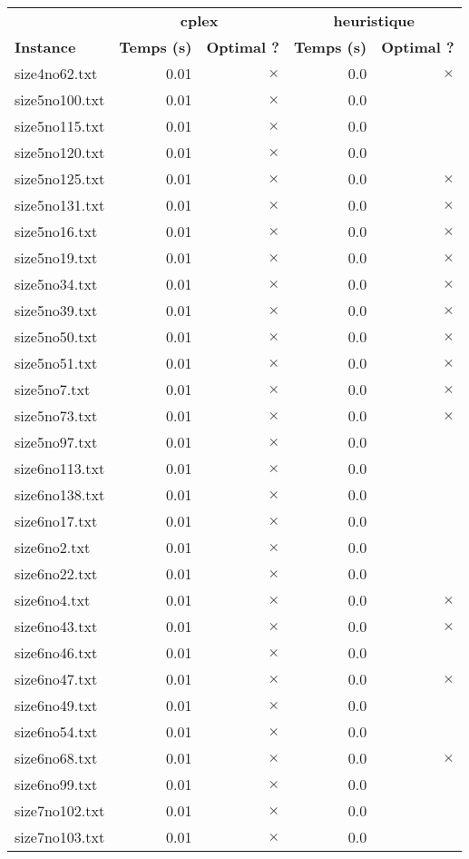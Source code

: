 \documentclass{article}
\begin{document}
\newpage
\begin{center}
\renewcommand{\arraystretch}{1.4} 
 \begin{tabular}{lrrrr}
	\hline
 & \multicolumn{2}{c}{\textbf{cplex}} & \multicolumn{2}{c}{\textbf{heuristique}}\\
\textbf{Instance}  & \textbf{Temps (s)} & \textbf{Optimal ?}  & \textbf{Temps (s)} & \textbf{Optimal ?} \\\hline

size4no62.txt & 0.01 & 
$\times$
 & 0.0 & 
$\times$
\\
size5no100.txt & 0.01 & 
$\times$
 & 0.0 & 
\\
size5no115.txt & 0.01 & 
$\times$
 & 0.0 & 
\\
size5no120.txt & 0.01 & 
$\times$
 & 0.0 & 
\\
size5no125.txt & 0.01 & 
$\times$
 & 0.0 & 
$\times$
\\
size5no131.txt & 0.01 & 
$\times$
 & 0.0 & 
$\times$
\\
size5no16.txt & 0.01 & 
$\times$
 & 0.0 & 
$\times$
\\
size5no19.txt & 0.01 & 
$\times$
 & 0.0 & 
$\times$
\\
size5no34.txt & 0.01 & 
$\times$
 & 0.0 & 
$\times$
\\
size5no39.txt & 0.01 & 
$\times$
 & 0.0 & 
$\times$
\\
size5no50.txt & 0.01 & 
$\times$
 & 0.0 & 
$\times$
\\
size5no51.txt & 0.01 & 
$\times$
 & 0.0 & 
$\times$
\\
size5no7.txt & 0.01 & 
$\times$
 & 0.0 & 
$\times$
\\
size5no73.txt & 0.01 & 
$\times$
 & 0.0 & 
$\times$
\\
size5no97.txt & 0.01 & 
$\times$
 & 0.0 & 
\\
size6no113.txt & 0.01 & 
$\times$
 & 0.0 & 
\\
size6no138.txt & 0.01 & 
$\times$
 & 0.0 & 
\\
size6no17.txt & 0.01 & 
$\times$
 & 0.0 & 
\\
size6no2.txt & 0.01 & 
$\times$
 & 0.0 & 
\\
size6no22.txt & 0.01 & 
$\times$
 & 0.0 & 
\\
size6no4.txt & 0.01 & 
$\times$
 & 0.0 & 
$\times$
\\
size6no43.txt & 0.01 & 
$\times$
 & 0.0 & 
$\times$
\\
size6no46.txt & 0.01 & 
$\times$
 & 0.0 & 
\\
size6no47.txt & 0.01 & 
$\times$
 & 0.0 & 
$\times$
\\
size6no49.txt & 0.01 & 
$\times$
 & 0.0 & 
\\
size6no54.txt & 0.01 & 
$\times$
 & 0.0 & 
\\
size6no68.txt & 0.01 & 
$\times$
 & 0.0 & 
$\times$
\\
size6no99.txt & 0.01 & 
$\times$
 & 0.0 & 
\\
size7no102.txt & 0.01 & 
$\times$
 & 0.0 & 
\\
size7no103.txt & 0.01 & 
$\times$
 & 0.0 & 
\\
\hline\end{tabular}
\end{center}
\end{document}
